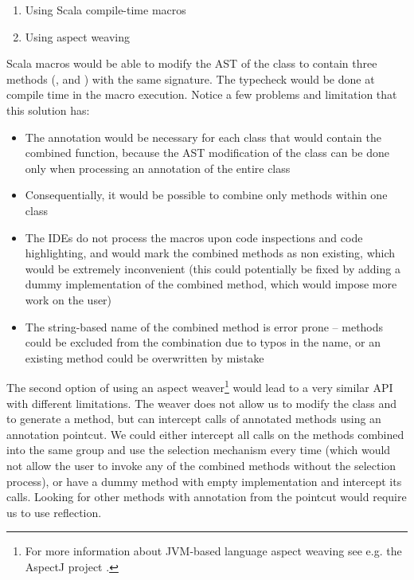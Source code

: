 \begin{enumerate}
	\item Using Scala compile-time macros
	\item Using aspect weaving
\end{enumerate}

Scala macros would be able to modify the AST of the  class to contain three methods (,  and ) with the same signature. The typecheck would be done at compile time in the macro execution. Notice a few problems and limitation that this solution has:

\begin{itemize}
	\item The  annotation would be necessary for each class that would contain the combined function, because the AST modification of the class can be done only when processing an annotation of the entire class
	\item Consequentially, it would be possible to combine only methods within one class
	\item The IDEs do not process the macros upon code inspections and code highlighting, and would mark the combined methods as non existing, which would be extremely inconvenient (this could potentially be fixed by adding a dummy implementation of the combined method, which would impose more work on the user)
	\item The string-based name of the combined method is error prone -- methods could be excluded from the combination due to typos in the name, or an existing method could be overwritten by mistake
\end{itemize}

The second option of using an aspect weaver\footnote{For more information about JVM-based language aspect weaving see e.g. the AspectJ project \cite{here_aspectj_nodate}.} would lead to a very similar API with different limitations. The weaver does not allow us to modify the class and to generate a method, but can intercept calls of annotated methods using an annotation pointcut. We could either intercept all calls on the methods combined into the same group and use the selection mechanism every time (which would not allow the user to invoke any of the combined methods without the selection process), or have a dummy method with empty implementation and intercept its calls. Looking for other methods with annotation from the pointcut would require us to use reflection.

